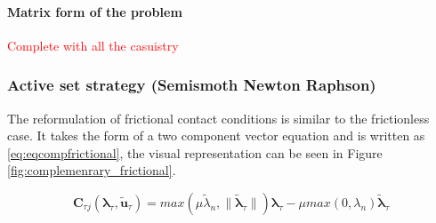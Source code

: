 \documentclass[a4paper,10pt]{article} %
\begin{document}
\paragraph{Matrix form of the problem}

\textcolor{red}{Complete with all the casuistry }

\subsubsection{Active set strategy (Semismoth Newton Raphson)}

The reformulation of frictional contact conditions is similar to the frictionless case. It takes the form of a two component vector equation and is written as \eqref{eq:eqcompfrictional}, the visual representation can be seen in Figure \ref{fig:complemenrary_frictional}.

\begin{equation}\label{eq:eqcompfrictional}
\mathbf{C}_{\tau j}(\boldsymbol{\lambda}_\tau, \tilde{\mathbf{u}}_{\tau}) = max(\mu \tilde{\lambda}_n, \| \tilde{\boldsymbol{\lambda}}_\tau \|) \boldsymbol{\lambda}_\tau - \mu max(0, \lambda_n)\tilde{\boldsymbol{\lambda}}_\tau
\end{equation}
\end{document}
